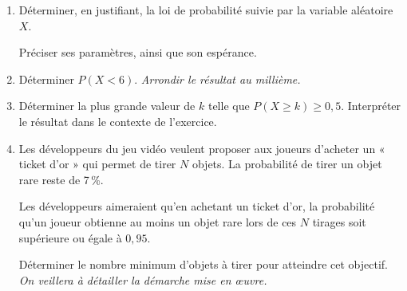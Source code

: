 \begin{enumerate}
	\item Déterminer, en justifiant, la loi de probabilité suivie par la variable aléatoire $X$.
	
	Préciser ses paramètres, ainsi que son espérance.
	\item Déterminer $P(X < 6)$. \textit{Arrondir le résultat au millième.}
	\item Déterminer la plus grande valeur de $k$ telle que $P(X \geqslant k) \geqslant 0,5$. Interpréter le résultat dans le contexte de l'exercice.
	\item Les développeurs du jeu vidéo veulent proposer aux joueurs d'acheter un « ticket d'or » qui permet de tirer $N$ objets. La probabilité de tirer un objet rare reste de 7\,\%.
	
	Les développeurs aimeraient qu'en achetant un ticket d'or, la probabilité qu'un joueur obtienne au moins un objet rare lors de ces $N$ tirages soit supérieure ou égale à $0,95$.
	
	Déterminer le nombre minimum d'objets à tirer pour atteindre cet objectif. \textit{On veillera à détailler la démarche mise en œuvre.} 
\end{enumerate}
